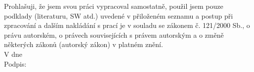 Prohlašuji, že jsem svou práci vypracoval samostatně, použil jsem pouze
podklady (literaturu, SW atd.) uvedené v přiloženém seznamu a postup při
zpracování a dalším nakládání s prací je v souladu se zákonem č. 121/2000 Sb.,
o právu autorském, o právech souvisejících s právem autorským a o změně
některých zákonů (autorský zákon) v platném znění.\\[1.5cm]

V \makebox[6cm]{\dotfill} dne \makebox[6cm]{\dotfill}\\[4cm]

Podpis: \makebox[12cm]{\dotfill}

\newpage

\tableofcontents
